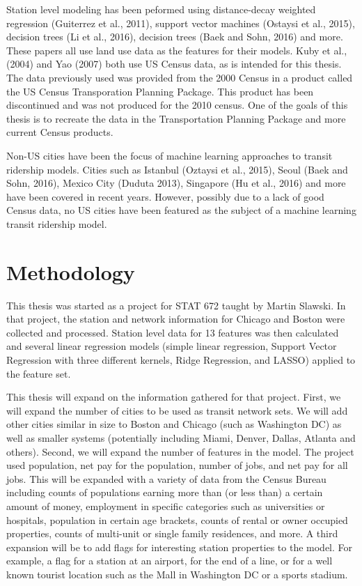 \documentclass{article}
\begin{document}
Station level modeling has been peformed using distance-decay weighted regression (Guiterrez et al., 2011), support vector machines (Ostaysi et al., 2015), decision trees (Li et al., 2016), decision trees (Baek and Sohn, 2016) and more. These papers all use land use data as the features for their models. Kuby et al., (2004) and Yao (2007) both use US Census data, as is intended for this thesis. The data previously used was provided from the 2000 Census in a product called the US Census Transporation Planning Package. This product has been discontinued and was not produced for the 2010 census. One of the goals of this thesis is to recreate the data in the Transportation Planning Package and more current Census products.

Non-US cities have been the focus of machine learning approaches to transit ridership models. Cities such as Istanbul (Oztaysi et al., 2015), Seoul (Baek and Sohn, 2016), Mexico City (Duduta 2013), Singapore (Hu et al., 2016) and more have been covered in recent years. However, possibly due to a lack of good Census  data, no US cities have been featured as the subject of a machine learning transit ridership model. 

\section{Methodology}

This thesis was started as a project for STAT 672 taught by Martin Slawski. In that project, the station and network information for Chicago and Boston were collected and processed. Station level data for 13 features was then calculated and several linear regression models (simple linear regression, Support Vector Regression with three different kernels, Ridge Regression, and LASSO) applied to the feature set. 

This thesis will expand on the information gathered for that project. First, we will expand the number of cities to be used as transit network sets. We will add other cities similar in size to Boston and Chicago (such as Washington DC) as well as smaller systems (potentially including Miami, Denver, Dallas, Atlanta and others). Second, we will expand the number of features in the model. The project used population, net pay for the population, number of jobs, and net pay for all jobs. This will be expanded with a variety of data from the Census Bureau including counts of populations earning more than (or less than) a certain amount of money, employment in specific categories such as universities or hospitals, population in certain age brackets, counts of rental or owner occupied properties, counts of multi-unit or single family residences, and more. A third expansion will be to add flags for interesting station properties to the model. For example, a flag for a station at an airport, for the end of a line, or for a well known tourist location such as the Mall in Washington DC or a sports stadium. 
\end{document}
